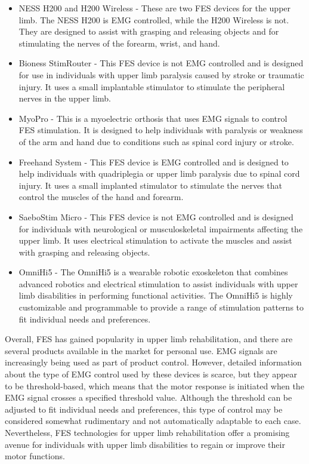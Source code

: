 \begin{itemize}
    \item NESS H200 and H200 Wireless - These are two FES devices for the upper limb. The NESS H200 is EMG controlled, while the H200 Wireless is not. They are designed to assist with grasping and releasing objects and for stimulating the nerves of the forearm, wrist, and hand.

    \item Bioness StimRouter - This FES device is not EMG controlled and is designed for use in individuals with upper limb paralysis caused by stroke or traumatic injury. It uses a small implantable stimulator to stimulate the peripheral nerves in the upper limb.

    \item MyoPro - This is a myoelectric orthosis that uses EMG signals to control FES stimulation. It is designed to help individuals with paralysis or weakness of the arm and hand due to conditions such as spinal cord injury or stroke.

    \item Freehand System - This FES device is EMG controlled and is designed to help individuals with quadriplegia or upper limb paralysis due to spinal cord injury. It uses a small implanted stimulator to stimulate the nerves that control the muscles of the hand and forearm.

    \item SaeboStim Micro - This FES device is not EMG controlled and is designed for individuals with neurological or musculoskeletal impairments affecting the upper limb. It uses electrical stimulation to activate the muscles and assist with grasping and releasing objects.

    \item OmniHi5 - The OmniHi5 is a wearable robotic exoskeleton that combines advanced robotics and electrical stimulation to assist individuals with upper limb disabilities in performing functional activities. The OmniHi5 is highly customizable and programmable to provide a range of stimulation patterns to fit individual needs and preferences.
\end{itemize}

Overall, FES has gained popularity in upper limb rehabilitation, and there are several products available in the market for personal use. EMG signals are increasingly being used as part of product control. However, detailed information about the type of EMG control used by these devices is scarce, but they appear to be threshold-based, which means that the motor response is initiated when the EMG signal crosses a specified threshold value. Although the threshold can be adjusted to fit individual needs and preferences, this type of control may be considered somewhat rudimentary and not automatically adaptable to each case. Nevertheless, FES technologies for upper limb rehabilitation offer a promising avenue for individuals with upper limb disabilities to regain or improve their motor functions.

